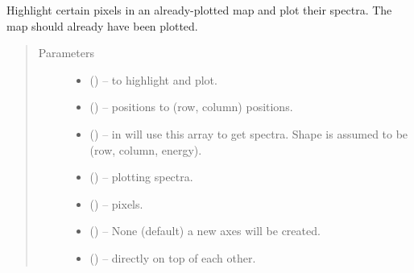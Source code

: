 \documentclass[letterpaper,10pt,english]{sphinxmanual}
\begin{document}

\begin{fulllineitems}
\label{\detokenize{xanespy:xanespy.plots.plot_pixel_spectra}}
Highlight certain pixels in an already-plotted map and plot their
spectra. The map should already have been plotted.
\begin{quote}\begin{description}
\item[{Parameters}] \leavevmode\begin{itemize}
\item {} 
 (\sphinxstyleliteralemphasis{-}) -- to highlight and plot.

\item {} 
 (\sphinxstyleliteralemphasis{-}) -- positions to (row, column) positions.

\item {} 
 (\sphinxstyleliteralemphasis{-}) -- in  will use this array to get spectra. Shape is assumed
to be (row, column, energy).

\item {} 
 (\sphinxstyleliteralemphasis{-}) -- plotting spectra.

\item {} 
 (\sphinxstyleliteralemphasis{-}) -- pixels.

\item {} 
 (\sphinxstyleliteralemphasis{-}) -- None (default) a new axes will be created.

\item {} 
 (\sphinxstyleliteralemphasis{-}) -- directly on top of each other.

\end{itemize}

\end{description}\end{quote}

\end{fulllineitems}

\end{document}
